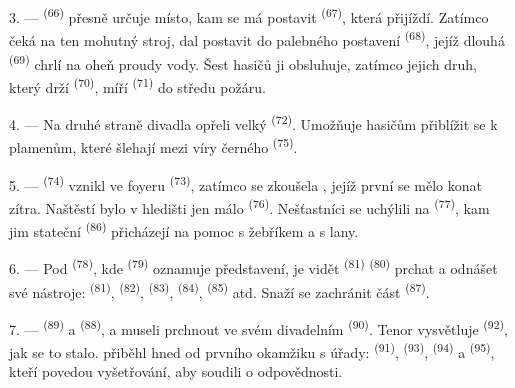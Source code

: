 3. ---  \textsuperscript{(66)} přesně určuje místo, kam se má
postavit  \textsuperscript{(67)}, která přijíždí. Zatímco čeká
na ten mohutný stroj, dal postavit do palebného postavení 
\textsuperscript{(68)}, jejíž dlouhá  \textsuperscript{(69)} chrlí na
oheň proudy vody. Šest hasičů ji obsluhuje, zatímco jejich druh, který drží
 \textsuperscript{(70)}, míří 
\textsuperscript{(71)} do středu požáru.

4. --- Na druhé straně divadla opřeli velký  \textsuperscript{(72)}.
Umožňuje hasičům přiblížit se k plamenům, které šlehají mezi víry černého
\textsuperscript{(75)}.

\VUsaut{5.0mm}
\VUsaut{3.4mm}

5. ---  \textsuperscript{(74)} vznikl ve foyeru 
\textsuperscript{(73)}, zatímco se zkoušela , jejíž první
 se mělo konat zítra. Naštěstí bylo v hledišti jen málo
 \textsuperscript{(76)}. Nešťastníci se uchýlili na 
\textsuperscript{(77)}, kam jim stateční  \textsuperscript{(86)}
přicházejí na pomoc s žebříkem a s lany.

6. --- Pod  \textsuperscript{(78)}, kde 
\textsuperscript{(79)} oznamuje představení, je vidět 
\textsuperscript{(81)}  \textsuperscript{(80)} prchat a odnášet své
nástroje:  \textsuperscript{(81)}, 
\textsuperscript{(82)},  \textsuperscript{(83)},
 \textsuperscript{(84)},  \textsuperscript{(85)} atd.
Snaží se zachránit část  \textsuperscript{(87)}.

7. ---  \textsuperscript{(89)} a 
\textsuperscript{(88)},  a  museli prchnout ve svém
divadelním  \textsuperscript{(90)}. Tenor vysvětluje
 \textsuperscript{(92)}, jak se to stalo.  přiběhl
hned od prvního okamžiku s úřady:  \textsuperscript{(91)},
 \textsuperscript{(93)}, 
\textsuperscript{(94)} a  \textsuperscript{(95)}, kteří
povedou vyšetřování, aby soudili o odpovědnosti.
